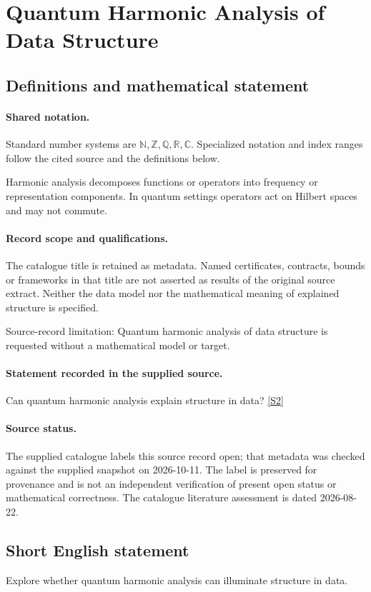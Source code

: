 \documentclass[11pt]{article}
\newcommand{\sref}[2]{\hyperlink{source:#1:#2}{[S#2]}}
\begin{document}
\section{Quantum Harmonic Analysis of Data Structure}\label{statement}

\subsection{Definitions and mathematical statement}

\paragraph{Shared notation.}Standard number systems are $\mathbb N,\mathbb Z,\mathbb Q,\mathbb R,\mathbb C$. Specialized notation and index ranges follow the cited source and the definitions below.


Harmonic analysis decomposes functions or operators into frequency or representation components. In quantum settings operators act on Hilbert spaces and may not commute.
\paragraph{Record scope and qualifications.}
The catalogue title is retained as metadata. Named certificates, contracts, bounds or frameworks in that title are not asserted as results of the original source extract.
Neither the data model nor the mathematical meaning of explained structure is specified.

Source-record limitation: Quantum harmonic analysis of data structure is requested without a mathematical model or target.
\paragraph{Statement recorded in the supplied source.}
Can quantum harmonic analysis explain structure in data? \sref{statement}{2}
\paragraph{Source status.}
The supplied catalogue labels this source record open; that metadata was checked against the supplied snapshot on 2026-10-11. The label is preserved for provenance and is not an independent verification of present open status or mathematical correctness. The catalogue literature assessment is dated 2026-08-22.
\subsection{Short English statement}
Explore whether quantum harmonic analysis can illuminate structure in data.
\end{document}

